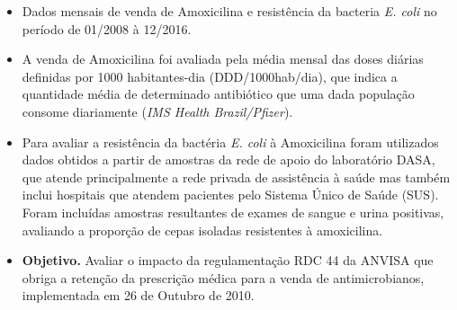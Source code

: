\documentclass[
]{book}
\begin{document}
\begin{itemize}
\item
  Dados mensais de venda de Amoxicilina e resistência da bacteria \emph{E. coli} no período de 01/2008 à 12/2016.
\item
  A venda de Amoxicilina foi avaliada pela média mensal das doses diárias definidas por 1000 habitantes-dia (DDD/1000hab/dia), que indica a quantidade média de determinado antibiótico que uma dada população consome diariamente (\emph{IMS Health Brazil/Pfizer}).
\item
  Para avaliar a resistência da bactéria \emph{E. coli} à Amoxicilina foram utilizados dados obtidos a partir de amostras da rede de apoio do laboratório DASA, que atende principalmente a rede privada de assistência à saúde mas também inclui hospitais que atendem pacientes pelo Sistema Único de Saúde (SUS). Foram
  incluídas amostras resultantes de exames de sangue e urina positivas, avaliando a proporção de cepas isoladas resistentes à amoxicilina.
\item
  \textbf{Objetivo.} Avaliar o impacto da regulamentação RDC 44 da ANVISA que
  obriga a retenção da prescrição médica para a venda de antimicrobianos, implementada em 26 de Outubro de 2010.
\end{itemize}
\end{document}
